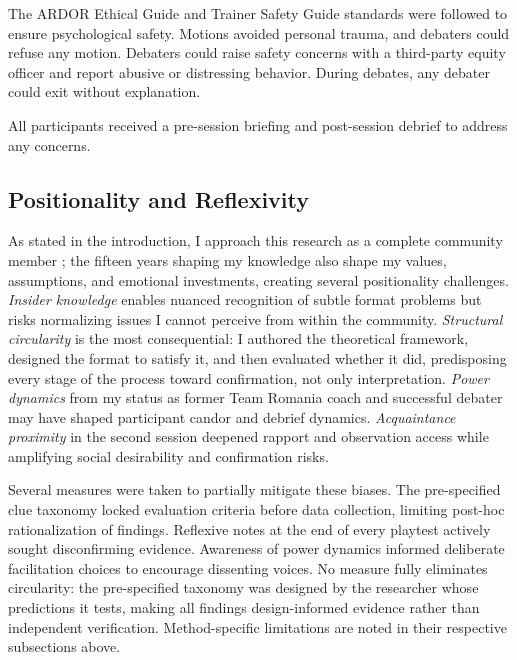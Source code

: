 The ARDOR Ethical Guide and Trainer Safety Guide standards were followed to ensure psychological safety. Motions avoided personal trauma, and debaters could refuse any motion. Debaters could raise safety concerns with a third-party equity officer and report abusive or distressing behavior. During debates, any debater could exit without explanation.

All participants received a pre-session briefing and post-session debrief to address any concerns.

\subsection{Positionality and Reflexivity}

As stated in the introduction, I approach this research as a complete community member \parencite{adler1987membership}; the fifteen years shaping my knowledge also shape my values, assumptions, and emotional investments, creating several positionality challenges. \textit{Insider knowledge} enables nuanced recognition of subtle format problems but risks normalizing issues I cannot perceive from within the community. \textit{Structural circularity} is the most consequential: I authored the theoretical framework, designed the format to satisfy it, and then evaluated whether it did, predisposing every stage of the process toward confirmation, not only interpretation. \textit{Power dynamics} from my status as former Team Romania coach and successful debater may have shaped participant candor and debrief dynamics. \textit{Acquaintance proximity} in the second session deepened rapport and observation access while amplifying social desirability and confirmation risks.

Several measures were taken to partially mitigate these biases. The pre-specified clue taxonomy locked evaluation criteria before data collection, limiting post-hoc rationalization of findings. Reflexive notes at the end of every playtest actively sought disconfirming evidence. Awareness of power dynamics informed deliberate facilitation choices to encourage dissenting voices. No measure fully eliminates circularity: the pre-specified taxonomy was designed by the researcher whose predictions it tests, making all findings design-informed evidence rather than independent verification. Method-specific limitations are noted in their respective subsections above.

